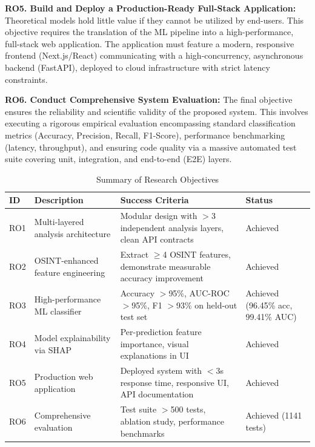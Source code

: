 \textbf{RO5. Build and Deploy a Production-Ready Full-Stack
Application:} Theoretical models hold little value if they cannot be
utilized by end-users. This objective requires the translation of the ML
pipeline into a high-performance, full-stack web application. The
application must feature a modern, responsive frontend (Next.js/React)
communicating with a high-concurrency, asynchronous backend (FastAPI),
deployed to cloud infrastructure with strict latency constraints.

\textbf{RO6. Conduct Comprehensive System Evaluation:} The final
objective ensures the reliability and scientific validity of the
proposed system. This involves executing a rigorous empirical evaluation
encompassing standard classification metrics (Accuracy, Precision,
Recall, F1-Score), performance benchmarking (latency, throughput), and
ensuring code quality via a massive automated test suite covering unit,
integration, and end-to-end (E2E) layers.

\setlength{\tabcolsep}{4pt}
\small
\begin{longtable}{
>{\raggedright\arraybackslash}p{}
>{\raggedright\arraybackslash}p{}
>{\raggedright\arraybackslash}p{}
>{\raggedright\arraybackslash}p{}}
\caption{Summary of Research Objectives} \\
\toprule
ID & Description & Success Criteria & Status \\
\midrule

RO1 & Multi-layered analysis architecture & Modular design with
$>$3 independent analysis layers, clean API contracts &
Achieved \\
RO2 & OSINT-enhanced feature engineering & Extract $\geq$4 OSINT
features, demonstrate measurable accuracy improvement & Achieved \\
RO3 & High-performance ML classifier & Accuracy $>$95\%,
AUC-ROC $>$95\%, F1 $>$93\% on held-out test set &
Achieved (96.45\% acc, 99.41\% AUC) \\
RO4 & Model explainability via SHAP & Per-prediction feature importance,
visual explanations in UI & Achieved \\
RO5 & Production web application & Deployed system with $<$3s
response time, responsive UI, API documentation & Achieved \\
 RO6 & Comprehensive evaluation & Test suite $>$500 tests,
ablation study, performance benchmarks & Achieved (1141 tests) \\

\bottomrule
\end{longtable}
\normalsize
\setlength{\tabcolsep}{6pt}

